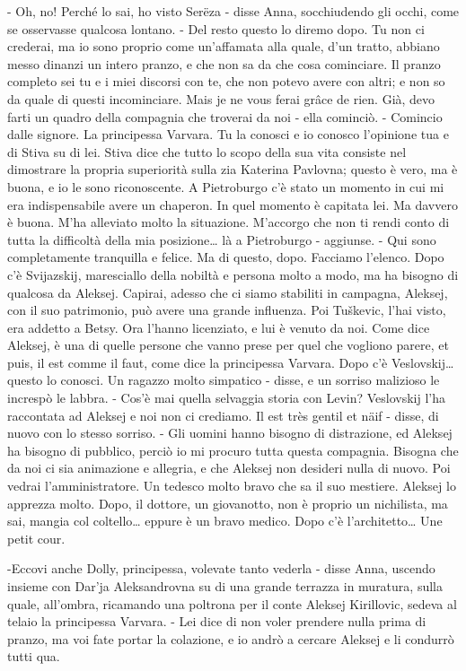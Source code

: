 - Oh, no! Perché lo sai, ho visto Serëza - disse Anna, socchiudendo gli occhi, come se osservasse qualcosa lontano. - Del resto questo lo diremo dopo. Tu non ci crederai, ma io sono proprio come un'affamata alla quale, d'un tratto, abbiano messo dinanzi un intero pranzo, e che non sa da che cosa cominciare. Il pranzo completo sei tu e i miei discorsi con te, che non potevo avere con altri; e non so da quale di questi incominciare. Mais je ne vous ferai grâce de rien. Già, devo farti un quadro della compagnia che troverai da noi - ella cominciò. - Comincio dalle signore. La principessa Varvara. Tu la conosci e io conosco l'opinione tua e di Stiva su di lei. Stiva dice che tutto lo scopo della sua vita consiste nel dimostrare la propria superiorità sulla zia Katerina Pavlovna; questo è vero, ma è buona, e io le sono riconoscente. A Pietroburgo c'è stato un momento in cui mi era indispensabile avere un chaperon. In quel momento è capitata lei. Ma davvero è buona. M'ha alleviato molto la situazione. M'accorgo che non ti rendi conto di tutta la difficoltà della mia posizione\ldots{} là a Pietroburgo - aggiunse. - Qui sono completamente tranquilla e felice. Ma di questo, dopo. Facciamo l'elenco. Dopo c'è Svijazskij, maresciallo della nobiltà e persona molto a modo, ma ha bisogno di qualcosa da Aleksej. Capirai, adesso che ci siamo stabiliti in campagna, Aleksej, con il suo patrimonio, può avere una grande influenza. Poi Tuškevic, l'hai visto, era addetto a Betsy. Ora l'hanno licenziato, e lui è venuto da noi. Come dice Aleksej, è una di quelle persone che vanno prese per quel che vogliono parere, et puis, il est comme il faut, come dice la principessa Varvara. Dopo c'è Veslovskij\ldots{} questo lo conosci. Un ragazzo molto simpatico - disse, e un sorriso malizioso le increspò le labbra. - Cos'è mai quella selvaggia storia con Levin? Veslovskij l'ha raccontata ad Aleksej e noi non ci crediamo. Il est très gentil et näif - disse, di nuovo con lo stesso sorriso. - Gli uomini hanno bisogno di distrazione, ed Aleksej ha bisogno di pubblico, perciò io mi procuro tutta questa compagnia. Bisogna che da noi ci sia animazione e allegria, e che Aleksej non desideri nulla di nuovo. Poi vedrai l'amministratore. Un tedesco molto bravo che sa il suo mestiere. Aleksej lo apprezza molto. Dopo, il dottore, un giovanotto, non è proprio un nichilista, ma sai, mangia col coltello\ldots{} eppure è un bravo medico. Dopo c'è l'architetto\ldots{} Une petit cour. 

-Eccovi anche Dolly, principessa, volevate tanto vederla - disse Anna, uscendo insieme con Dar'ja Aleksandrovna su di una grande terrazza in muratura, sulla quale, all'ombra, ricamando una poltrona per il conte Aleksej Kirillovic, sedeva al telaio la principessa Varvara. - Lei dice di non voler prendere nulla prima di pranzo, ma voi fate portar la colazione, e io andrò a cercare Aleksej e li condurrò tutti qua. 

